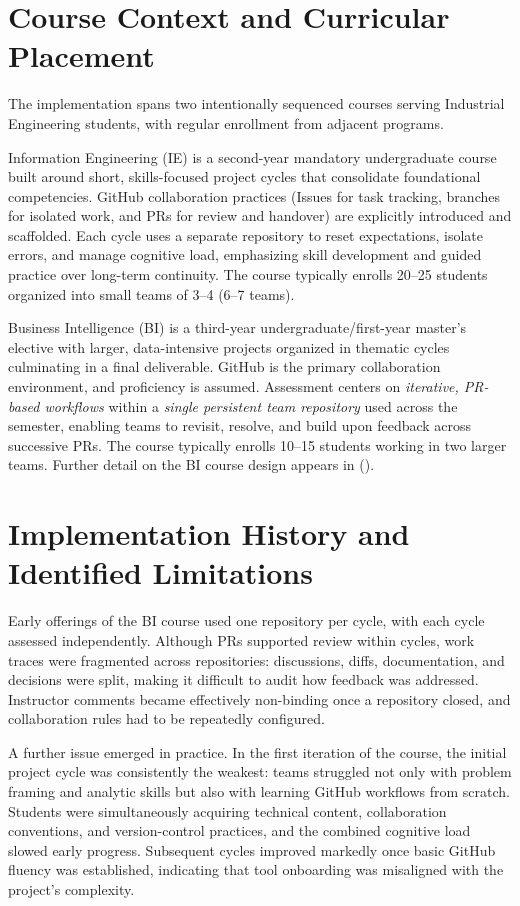 \section{Course Context and Curricular Placement}
The implementation spans two intentionally sequenced courses serving Industrial Engineering students, with regular enrollment from adjacent programs.

Information Engineering (IE) is a second-year mandatory undergraduate course built around short, skills-focused project cycles that consolidate foundational competencies. GitHub collaboration practices (Issues for task tracking, branches for isolated work, and PRs for review and handover) are explicitly introduced and scaffolded. Each cycle uses a separate repository to reset expectations, isolate errors, and manage cognitive load, emphasizing skill development and guided practice over long-term continuity. The course typically enrolls 20--25 students organized into small teams of 3--4 (6--7 teams).

Business Intelligence (BI) is a third-year undergraduate/first-year master's elective with larger, data-intensive projects organized in thematic cycles culminating in a final deliverable. GitHub is the primary collaboration environment, and proficiency is assumed. Assessment centers on \emph{iterative, PR-based workflows} within a \emph{single persistent team repository} used across the semester, enabling teams to revisit, resolve, and build upon feedback across successive PRs. The course typically enrolls 10--15 students working in two larger teams. Further detail on the BI course design appears in \citeauthor{Ingimundardottir2026Industry} (\citeyear{Ingimundardottir2026Industry}).

\section{Implementation History and Identified Limitations}

Early offerings of the BI course used one repository per cycle, with each cycle assessed independently. Although PRs supported review within cycles, work traces were fragmented across repositories: discussions, diffs, documentation, and decisions were split, making it difficult to audit how feedback was addressed. Instructor comments became effectively non-binding once a repository closed, and collaboration rules had to be repeatedly configured.

A further issue emerged in practice. In the first iteration of the course, the initial project cycle was consistently the weakest: teams struggled not only with problem framing and analytic skills but also with learning GitHub workflows from scratch. Students were simultaneously acquiring technical content, collaboration conventions, and version-control practices, and the combined cognitive load slowed early progress. Subsequent cycles improved markedly once basic GitHub fluency was established, indicating that tool onboarding was misaligned with the project's complexity.

